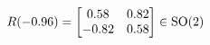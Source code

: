 \documentclass[preview]{standalone}
\begin{document}
\begin{align*}
\special{dvisvgm:raw <g id='unique000'>}R(-0.96) = \begin{bmatrix} 0.58 & 0.82 \\ -0.82 & 0.58 \end{bmatrix} \in \text{SO}(2)\special{dvisvgm:raw </g>}
\end{align*}
\end{document}
